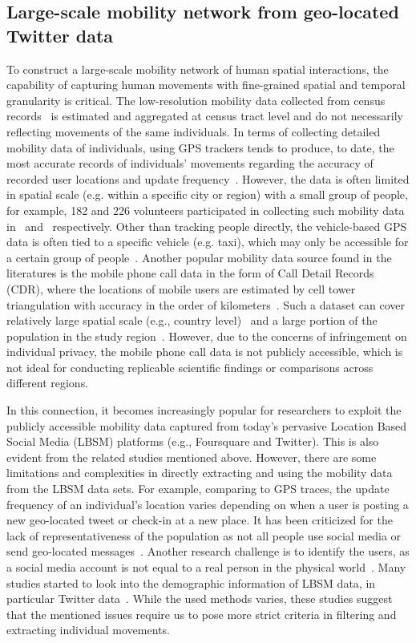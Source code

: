 \documentclass[]{tGIS2e}
\begin{document}
\subsection{Large-scale mobility network from geo-located Twitter data}
To construct a large-scale mobility network of human spatial interactions, the capability of capturing human movements with fine-grained spatial and temporal granularity is critical.
The low-resolution mobility data collected from census records~\citep{rae2009} is estimated and aggregated at census tract level and do not necessarily reflecting movements of the same individuals.
In terms of collecting detailed mobility data of individuals, using GPS trackers tends to produce, to date, the most accurate records of individuals' movements regarding the accuracy of recorded user locations and update frequency~\citep{zheng2008}.
However, the data is often limited in spatial scale (e.g. within a specific city or region) with a small group of people, for example, 182 and 226 volunteers participated in collecting such mobility data in~\citep{zheng2008} and~\citep{rhee2011} respectively.
Other than tracking people directly, the vehicle-based GPS data is often tied to a specific vehicle (e.g. taxi), which may only be accessible for a certain group of people~\citep{kung2014}. 
Another popular mobility data source found in the literatures is the mobile phone call data in the form of Call Detail Records (CDR), where the locations of mobile users are estimated by cell tower triangulation with accuracy in the order of kilometers~\citep{gonzalez2008,kung2014,zhong2014}. 
Such a dataset can cover relatively large spatial scale (e.g., country level)~\citep{sobolevsky2013} and a large portion of the population in the study region~\citep{kung2014}. 
However, due to the concerns of infringement on individual privacy, the mobile phone call data is not publicly accessible, which is not ideal  for conducting replicable scientific findings or comparisons across different regions.

In this connection, it becomes increasingly popular for researchers to exploit the publicly accessible mobility data captured from today's pervasive Location Based Social Media (LBSM) platforms (e.g., Foursquare and Twitter).
This is also evident from the related studies mentioned above.
However, there are some limitations and complexities in directly extracting and using the mobility data from the LBSM data sets. 
For example, comparing to GPS traces, the update frequency of an individual's location varies depending on when a user is posting a new geo-located tweet or check-in at a new place.
It has been criticized for the lack of representativeness of the population as not all people use social media or send geo-located messages~\citep{kung2014}. 
Another research challenge is to identify the users, as a social media account is not equal to a real person in the physical world~\citep{tsou2015}.
Many studies started to look into the demographic information of LBSM data, in particular Twitter data~\citep{steiger2015,luo2016}. 
While the used methods varies, these studies suggest that the mentioned issues require us to pose more strict criteria in filtering and extracting individual movements.
\end{document}
